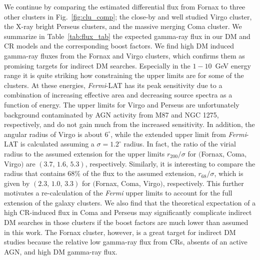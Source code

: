 \documentclass[10pt,aps,pra,reprint,amsmath,amsfonts,amssymb,showpacs,nofootinbib,floatfix]{revtex4-1}
\newcommand{\Fermi}{{\em Fermi}\xspace}
\newcommand{\rvir}{r_{200}}
\begin{document}
We continue by comparing the estimated differential flux from Fornax
to three other clusters in Fig.~\ref{fig:clu_comp}; the close-by and
well studied Virgo cluster, the X-ray bright Perseus clusters, and the
massive merging Coma cluster. We summarize in Table~\ref{tab:flux_tab}
the expected gamma-ray flux in our DM and CR models and the
corresponding boost factors.  We find high DM induced gamma-ray fluxes
from the Fornax and Virgo clusters, which confirms them as promising
targets for indirect DM searches. Especially in the $1-10$~GeV energy
range it is quite striking how constraining the upper limits are for
some of the clusters. At these energies, \Fermi-LAT has its peak
sensitivity due to a combination of increasing effective area and
decreasing source spectra as a function of energy. The upper limits
for Virgo and Perseus are unfortunately background contaminated by AGN
activity from M87 and NGC 1275, respectively, and do not gain much
from the increased sensitivity. In addition, the angular radius of
Virgo is about $6^\circ$, while the extended upper limit from
\Fermi-LAT is calculated assuming a $\sigma=1.2^\circ$ radius. In
fact, the ratio of the virial radius to the assumed extension for the
upper limits $\rvir/\sigma$ for $($Fornax, Coma, Virgo$)$ are
$(3.7,\,1.6,\,5.3)$, respectively. Similarly, it is interesting to
compare the radius that contains 68\% of the flux to the assumed
extension, $r_{68}/\sigma$, which is given by $(2.3,\,1.0,\,3.3)$ for
$($Fornax, Coma, Virgo$)$, respectively. This further motivates a
re-calculation of the \Fermi upper limits to account for the full
extension of the galaxy clusters. We also find that the theoretical
expectation of a high CR-induced flux in Coma and Perseus may
significantly complicate indirect DM searches in those clusters if the
boost factors are much lower than assumed in this work. The Fornax
cluster, however, is a great target for indirect DM studies because
the relative low gamma-ray flux from CRs, absents of an active AGN,
and high DM gamma-ray flux.
\end{document}
